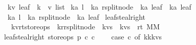 \begin{isabellebody}
\isanewline
{}\isamarkupfalse%
\ {\isacharparenleft}{\isacharprime}k{\isacharcomma}{\isacharprime}v{\isacharparenright}\ leaf\ {\isacharequal}\ {\isachardoublequoteopen}{\isacharparenleft}{\isacharprime}k\ {\isacharasterisk}\ {\isacharprime}v{\isacharparenright}\ list{\isachardoublequoteclose}\isanewline
\isanewline
\isanewline
{}\isamarkupfalse%
\ {\isacharparenleft}{\isacharprime}k{\isacharcomma}{\isacharprime}a{\isacharparenright}\ l{}\ {\isacharequal}\ {\isachardoublequoteopen}{\isacharparenleft}{\isacharprime}k{\isacharcomma}{\isacharprime}a{\isacharparenright}\ rsplit{\isacharunderscore}node\ {\isacharasterisk}\ {\isacharparenleft}{\isacharprime}k{\isacharcomma}{\isacharprime}a{\isacharparenright}\ leaf\ {\isacharasterisk}\ {\isacharparenleft}{\isacharprime}k{\isacharcomma}{\isacharprime}a{\isacharparenright}\ leaf{\isachardoublequoteclose}\isanewline
{}\isamarkupfalse%
\ {\isacharparenleft}{\isacharprime}k{\isacharcomma}{\isacharprime}a{\isacharparenright}\ l{}\ {\isacharequal}\ {\isachardoublequoteopen}{\isacharparenleft}{\isacharprime}k{\isacharcomma}{\isacharprime}a{\isacharparenright}\ rsplit{\isacharunderscore}node\ {\isacharasterisk}\ {\isacharparenleft}{\isacharprime}k{\isacharcomma}{\isacharprime}a{\isacharparenright}\ leaf{\isachardoublequoteclose}\isanewline
\isanewline
\isanewline
{}\isamarkupfalse%
\ leaf{\isacharunderscore}steal{\isacharunderscore}right\ {\isacharcolon}{\isacharcolon}\ \isanewline
\ \ {\isachardoublequoteopen}{\isacharparenleft}{\isacharprime}k{\isacharcomma}{\isacharprime}v{\isacharcomma}{\isacharprime}r{\isacharcomma}{\isacharprime}t{\isacharparenright}store{\isacharunderscore}ops\ {\isasymRightarrow}\ {\isacharparenleft}{\isacharprime}k{\isacharcomma}{\isacharprime}r{\isacharparenright}rsplit{\isacharunderscore}node\ {\isasymRightarrow}\ {\isacharparenleft}{\isacharprime}k{\isacharasterisk}{\isacharprime}v{\isacharparenright}s\ {\isasymRightarrow}\ {\isacharparenleft}{\isacharprime}k{\isacharasterisk}{\isacharprime}v{\isacharparenright}s\ {\isasymRightarrow}\ {\isacharparenleft}{\isacharprime}r{\isacharcomma}{\isacharprime}t{\isacharparenright}\ MM{\isachardoublequoteclose}\ \ \isanewline
{}\isanewline
{\isachardoublequoteopen}leaf{\isacharunderscore}steal{\isacharunderscore}right\ store{\isacharunderscore}ops\ p\ c{}\ c{}\ {\isacharequal}\ {\isacharparenleft}\isanewline
\ \ case\ c{}\ of\ k{}{\isacharhash}k{}{\isacharhash}kvs{}\ {\isasymRightarrow}\ \isanewline

\end{isabellebody}
